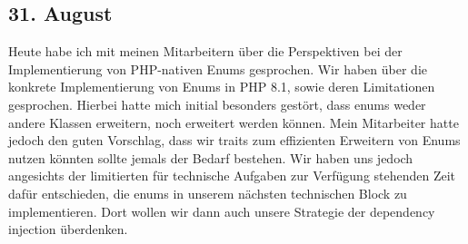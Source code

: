 \subsection{31. August}
Heute habe ich mit meinen Mitarbeitern über die Perspektiven bei der Implementierung von PHP-nativen Enums gesprochen. Wir haben über die konkrete Implementierung von Enums in PHP 8.1, sowie deren Limitationen gesprochen. Hierbei hatte mich initial besonders gestört, dass enums weder andere Klassen erweitern, noch erweitert werden können. Mein Mitarbeiter hatte jedoch den guten Vorschlag, dass wir traits zum effizienten Erweitern von Enums nutzen könnten sollte jemals der Bedarf bestehen. Wir haben uns jedoch angesichts der limitierten für technische Aufgaben zur Verfügung stehenden Zeit dafür entschieden, die enums in unserem nächsten technischen Block zu implementieren. Dort wollen wir dann auch unsere Strategie der dependency injection überdenken.